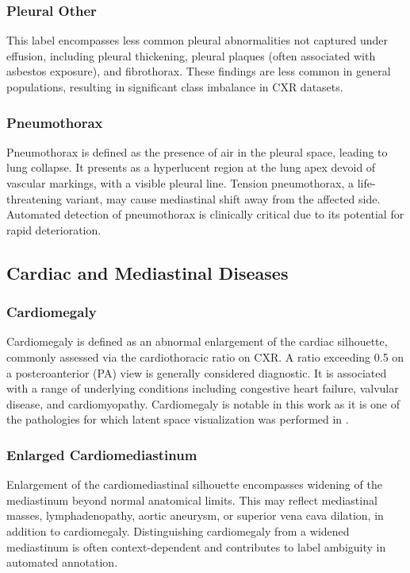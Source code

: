 \subsubsection{Pleural Other}
This label encompasses less common pleural abnormalities not captured under effusion, including pleural 
thickening, pleural plaques (often associated with asbestos exposure), and fibrothorax. These findings 
are less common in general populations, resulting in significant class imbalance in CXR datasets.

\subsubsection{Pneumothorax}
Pneumothorax is defined as the presence of air in the pleural space, leading to lung collapse. It presents 
as a hyperlucent region at the lung apex devoid of vascular markings, with a visible pleural line. 
Tension pneumothorax, a life-threatening variant, may cause mediastinal shift away from the affected side. 
Automated detection of pneumothorax is clinically critical due to its potential for rapid deterioration.

\subsection{Cardiac and Mediastinal Diseases}

\subsubsection{Cardiomegaly}
Cardiomegaly is defined as an abnormal enlargement of the cardiac silhouette, commonly assessed via 
the cardiothoracic ratio on CXR. A ratio exceeding 0.5 on a posteroanterior (PA) view is generally 
considered diagnostic. It is associated with a range of underlying conditions including congestive heart 
failure, valvular disease, and cardiomyopathy. Cardiomegaly is notable in this work as it is one of 
the pathologies for which latent space visualization was performed in .

\subsubsection{Enlarged Cardiomediastinum}
Enlargement of the cardiomediastinal silhouette encompasses widening of the mediastinum beyond normal 
anatomical limits. This may reflect mediastinal masses, lymphadenopathy, aortic aneurysm, or superior 
vena cava dilation, in addition to cardiomegaly. Distinguishing cardiomegaly from a widened mediastinum 
is often context-dependent and contributes to label ambiguity in automated annotation.

